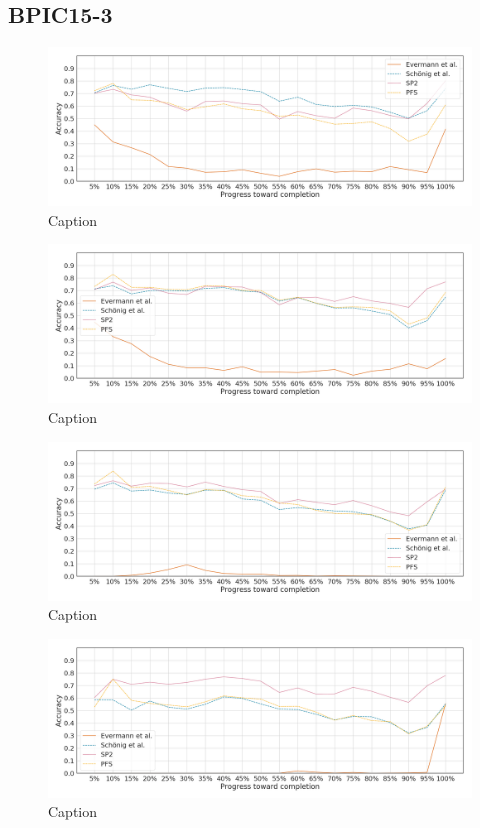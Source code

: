 \FloatBarrier
\subsection{BPIC15-3}
\begin{figure}[!htb]
    \centering
    \includegraphics[width=\textwidth]{gfx/bpic2015_3/individual_stability.png}
    \caption{Caption}
    \label{fig:my_label}
\end{figure}
\begin{figure}[!htb]
    \centering
    \includegraphics[width=\textwidth]{gfx/bpic2015_3/grouped_stability.png}
    \caption{Caption}
    \label{fig:my_label}
\end{figure}
\begin{figure}[!htb]
    \centering
    \includegraphics[width=\textwidth]{gfx/bpic2015_3/padded_stability.png}
    \caption{Caption}
    \label{fig:my_label}
\end{figure}
\begin{figure}[!htb]
    \centering
    \includegraphics[width=\textwidth]{gfx/bpic2015_3/windowed_stability.png}
    \caption{Caption}
    \label{fig:my_label}
\end{figure}